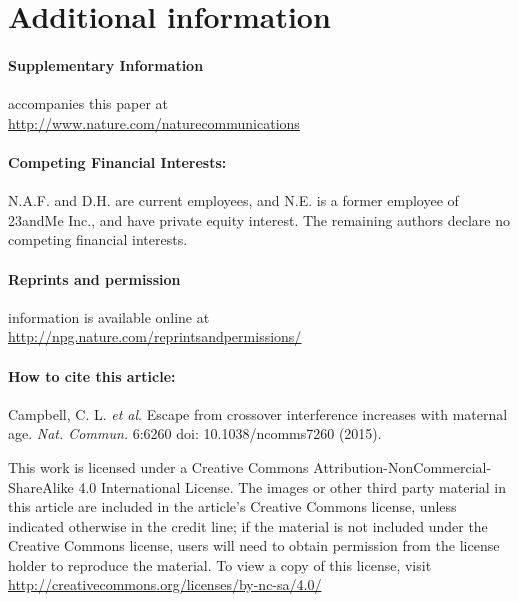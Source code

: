 \section{Additional information}

\paragraph{Supplementary Information} accompanies this paper at \\ \url{http://www.nature.com/naturecommunications}

\paragraph{Competing Financial Interests:} N.A.F. and D.H. are current employees, and N.E. is a
former employee of 23andMe Inc., and have private equity interest. The remaining
authors declare no competing financial interests.

\paragraph{Reprints and permission} information is available online at \\
\url{http://npg.nature.com/reprintsandpermissions/}

\paragraph{How to cite this article:} Campbell, C. L. \textit{et al}. Escape from crossover interference
increases with maternal age. \textit{Nat. Commun.} 6:6260 doi: 10.1038/ncomms7260 (2015).

\bigskip \noindent
This work is licensed under a 
Creative Commons Attribution-NonCommercial-ShareAlike 4.0 International License. The images or
other third party material in this article are included in the article's Creative Commons
license, unless indicated otherwise in the credit line; if the material is not included under
the Creative Commons license, users will need to obtain permission from the license
holder to reproduce the material. To view a copy of this license, visit \\
\url{http://creativecommons.org/licenses/by-nc-sa/4.0/}



